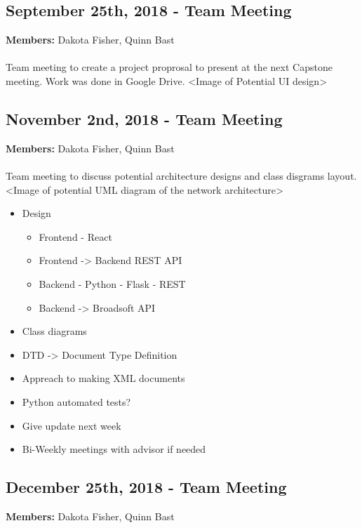 \documentclass[12pt]{article}
\begin{document}
\subsection{September 25th, 2018 - Team Meeting}
\textbf{Members:} Dakota Fisher, Quinn Bast
\paragraph{} 
	Team meeting to create a project proprosal to present at the next Capstone meeting. Work was done in Google Drive.
	<Image of Potential UI design>

\subsection{November 2nd, 2018 - Team Meeting}
\textbf{Members:} Dakota Fisher, Quinn Bast
\paragraph{} 
	Team meeting to discuss potential architecture designs and class disgrams layout.
	<Image of potential UML diagram of the network architecture>
\begin{itemize}
	\item Design
	\begin{itemize}
		\item Frontend - React
		\item Frontend -> Backend REST API
		\item Backend - Python - Flask - REST
		\item Backend -> Broadsoft API
	\end{itemize}
	\item Class diagrams
	\item DTD -> Document Type Definition
	\item Appreach to making XML documents
	\item Python automated tests?
	\item Give update next week
	\item Bi-Weekly meetings with advisor if needed
\end{itemize}
	
\subsection{December 25th, 2018 - Team Meeting}
\textbf{Members:} Dakota Fisher, Quinn Bast
\end{document}
